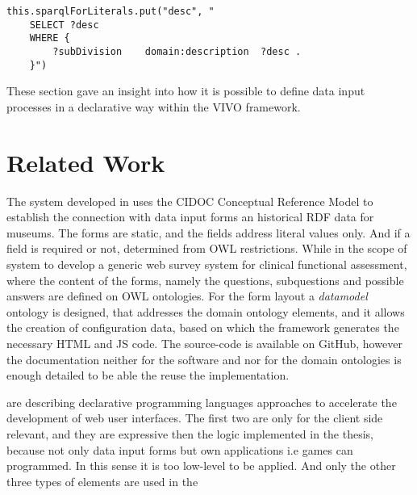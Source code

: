 \begin{lstlisting}[captionpos=b, caption= SPARQL forExisting variable definition, label=skullJSON, belowskip=1em, aboveskip=2em,
basicstyle=\footnotesize,frame=single]
	this.sparqlForLiterals.put("desc", "
	SELECT ?desc
	WHERE { 
		?subDivision	domain:description	?desc .
	}")
\end{lstlisting}

These section gave an insight into how it is possible to define data input processes in a declarative way within the VIVO framework.

\section{Related Work}

The system developed in \cite{DBLP:conf/icbo/GoncalvesTNTM15} uses the CIDOC Conceptual Reference Model \cite{CIDOC501} to establish the connection with data input forms an historical RDF data for museums. The forms are static, and the fields address literal values only. And if a field is required or not, determined from OWL restrictions. While in \cite{embeddingOntology} the scope of system to develop a generic web survey system for clinical functional assessment, where the content of the forms, namely the questions, subquestions and possible answers are defined on OWL ontologies. For the form layout a \textit{datamodel} ontology is designed, that addresses the domain ontology elements, and it allows the creation of configuration data, based on which the framework generates the necessary HTML and JS code. The source-code is available on GitHub, however the documentation neither for the software and nor for the domain ontologies is enough detailed to be able the reuse the implementation.


\cite{Hanus06PPDP, Hanus2000, Brassel2008} are describing declarative programming languages approaches to accelerate the development of web user interfaces. The first two are only for the client side relevant, and they are expressive then the logic implemented in the thesis, because not only data input forms but own applications i.e games can programmed. In this sense it is too low-level to be applied. And only the other three types of elements are used in the 







